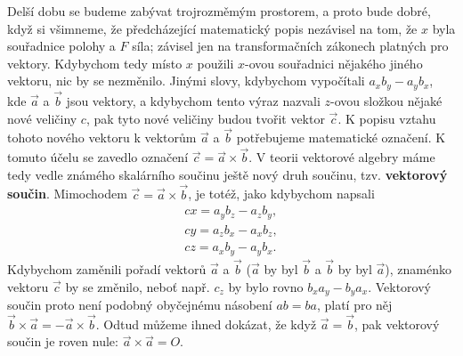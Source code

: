     Delší dobu se budeme zabývat trojrozměmým prostorem, a proto bude dobré, když si všimneme, že
    předcházející matematický popis nezávisel na tom, že \(x\) byla souřadnice polohy a \(F\) síla;
    závisel jen na transformačních zákonech platných pro vektory. Kdybychom tedy místo \(x\) použili
    \(x\)-ovou souřadnici nějakého jiného vektoru, nic by se nezměnilo. Jinými slovy, kdybychom
    vypočítali \(a_xb_y - a_yb_x\), kde \(\vec{a}\) a \(\vec{b}\) jsou vektory, a kdybychom tento
    výraz nazvali \(z\)-ovou složkou nějaké nové veličiny \(c\), pak tyto nové veličiny budou tvořit
    vektor \(\vec{c}\). K popisu vztahu tohoto nového vektoru k vektorům \(\vec{a}\) a \(\vec{b}\)
    potřebujeme matematické označení. K tomuto účelu se zavedlo označení \(\vec{c} = \vec{a} \times
    \vec{b}\). V teorii vektorové algebry máme tedy vedle známého skalárního součinu ještě nový druh
    součinu, tzv. \textbf{vektorový součin}. Mimochodem \(\vec{c} = \vec{a} \times \vec{b}\), je
    totéž, jako kdybychom napsali
    \begin{subequations}\label{fyz:eq718}
      \begin{align}
        cx =a_yb_z−a_zb_y,    \label{fyz:eq718a}  \\
        cy =a_zb_x−a_xb_z,    \label{fyz:eq718b}  \\
        cz =a_xb_y−a_yb_x.    \label{fyz:eq718c}
      \end{align}
    \end{subequations}
    Kdybychom zaměnili pořadí vektorů \(\vec{a}\) a \(\vec{b}\) (\(\vec{a}\) by byl \(\vec{b}\) a
    \(\vec{b}\) by byl \(\vec{a}\)), znaménko vektoru \(\vec{c}\) by se změnilo, neboť např. \(c_z\)
    by bylo rovno \(b_xa_y - b_ya_x\). Vektorový součin proto není podobný obyčejnému násobení \(ab=
    ba\), platí pro něj \(\vec{b}\times\vec{a}=−\vec{a}\times\vec{b}\). Odtud můžeme ihned dokázat,
    že když \(\vec{a} = \vec{b}\), pak vektorový součin je roven nule: \(\vec{a}\times\vec{a} = O\).

